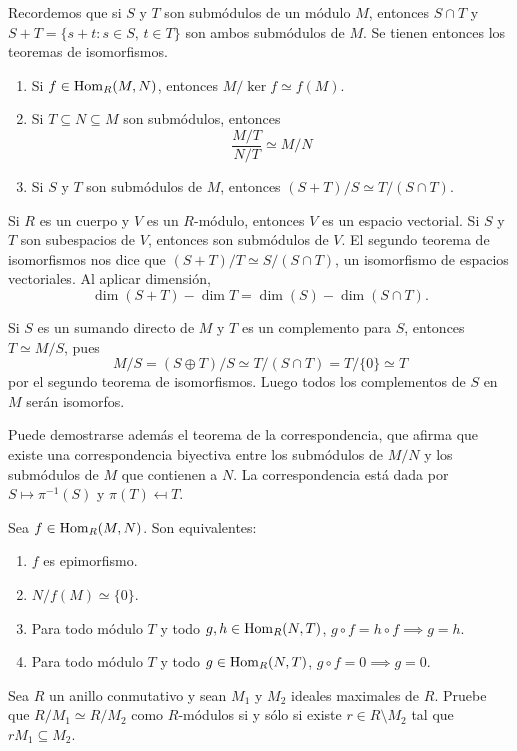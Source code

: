 Recordemos que si $S$ y $T$ son submódulos de un módulo $M$, entonces
$S\cap T$ y $S+T=\{s+t:s\in S,\,t\in T\}$ son ambos submódulos de $M$. 
Se tienen entonces los teoremas de isomorfismos. 
\begin{enumerate}
	\item Si $f\in\operatorname{Hom}_R(M,N)$, entonces $M/\ker f\simeq f(M)$.
	\item Si $T\subseteq N\subseteq M$ son submódulos, entonces 
	\[
	\frac{M/T}{N/T}\simeq M/N
	\]
	\item Si $S$ y $T$ son submódulos de $M$, entonces $(S+T)/S\simeq T/(S\cap T)$. 
\end{enumerate}

\begin{example}
Si $R$ es un cuerpo y $V$ es un $R$-módulo, entonces $V$ es un espacio vectorial. 
Si $S$ y $T$ son subespacios de $V$, entonces son submódulos de $V$. 
El segundo teorema de isomorfismos nos dice que $(S+T)/T\simeq S/(S\cap T)$, 
un isomorfismo de espacios vectoriales. Al aplicar dimensión, 
\[
\dim(S+T)-\dim T=\dim(S)-\dim(S\cap T).
\]
\end{example}

\begin{example}
Si $S$ es un sumando directo de $M$ y $T$ es un complemento para $S$, entonces $T\simeq M/S$, pues
\[
M/S=(S\oplus T)/S\simeq T/(S\cap T)=T/\{0\}\simeq T
\]
por el segundo teorema de isomorfismos. Luego todos los complementos
de $S$ en $M$ serán isomorfos.  	
\end{example}

Puede demostrarse además el teorema de la correspondencia, que afirma que existe una correspondencia biyectiva 
entre los submódulos de $M/N$ y los submódulos de $M$ que contienen a $N$. La correspondencia está dada
por $S\mapsto \pi^{-1}(S)$ y $\pi(T)\mapsfrom T$. 

\begin{exercise}
Sea $f\in\operatorname{Hom}_R(M,N)$. Son equivalentes: 
\begin{enumerate}
\item $f$ es epimorfismo.
\item $N/f(M)\simeq\{0\}$. 
\item Para todo módulo $T$ y todo $g,h\in\operatorname{Hom}_R(N,T)$, $g\circ f=h\circ f\implies g=h$.
\item Para todo módulo $T$ y todo $g\in\operatorname{Hom}_R(N,T)$, $g\circ f=0\implies g=0$. 
\end{enumerate}
\end{exercise}

\begin{exercise}
\label{xca:mod_iso_max}
    Sea $R$ un anillo conmutativo y sean $M_1$ y $M_2$ ideales
    maximales de $R$. Pruebe que $R/M_1\simeq R/M_2$ como $R$-módulos 
    si y sólo si existe $r\in R\setminus M_2$ tal que $rM_1\subseteq M_2$. 
\end{exercise}


